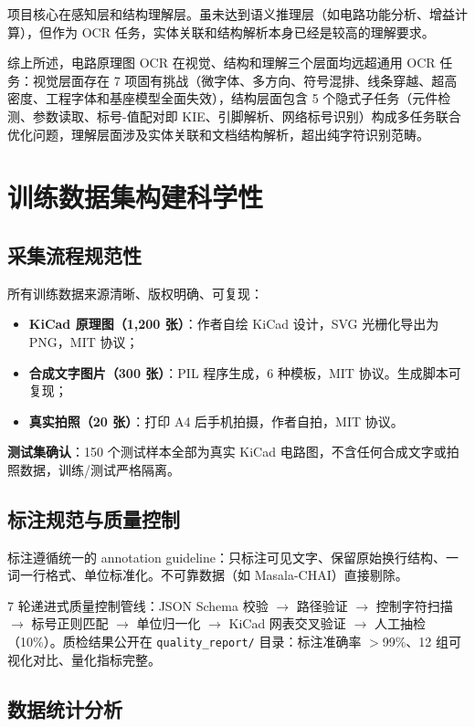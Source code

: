 项目核心在感知层和结构理解层。虽未达到语义推理层（如电路功能分析、增益计算），但作为 OCR 任务，实体关联和结构解析本身已经是较高的理解要求。

综上所述，电路原理图 OCR 在视觉、结构和理解三个层面均远超通用 OCR 任务：视觉层面存在 7 项固有挑战（微字体、多方向、符号混排、线条穿越、超高密度、工程字体和基座模型全面失效），结构层面包含 5 个隐式子任务（元件检测、参数读取、标号-值配对即 KIE、引脚解析、网络标号识别）构成多任务联合优化问题，理解层面涉及实体关联和文档结构解析，超出纯字符识别范畴。

\section{训练数据集构建科学性}

\subsection{采集流程规范性}

所有训练数据来源清晰、版权明确、可复现：

\begin{itemize}[nosep]
    \item \textbf{KiCad 原理图（1,200 张）}：作者自绘 KiCad 设计，SVG 光栅化导出为 PNG，MIT 协议；
    \item \textbf{合成文字图片（300 张）}：PIL 程序生成，6 种模板，MIT 协议。生成脚本可复现；
    \item \textbf{真实拍照（20 张）}：打印 A4 后手机拍摄，作者自拍，MIT 协议。
\end{itemize}

\textbf{测试集确认}：150 个测试样本全部为真实 KiCad 电路图，不含任何合成文字或拍照数据，训练/测试严格隔离。

\subsection{标注规范与质量控制}

标注遵循统一的 annotation guideline：只标注可见文字、保留原始换行结构、一词一行格式、单位标准化。不可靠数据（如 Masala-CHAI）直接剔除。

7 轮递进式质量控制管线：JSON Schema 校验 $\to$ 路径验证 $\to$ 控制字符扫描 $\to$ 标号正则匹配 $\to$ 单位归一化 $\to$ KiCad 网表交叉验证 $\to$ 人工抽检（10\%）。质检结果公开在 \texttt{quality\_report/} 目录：标注准确率 $>$99\%、12 组可视化对比、量化指标完整。

\subsection{数据统计分析}

